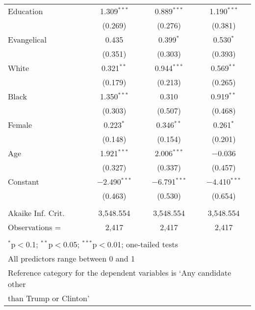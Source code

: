 \documentclass[12pt]{article}
\begin{document}
\begin{appendices}
\begin{refsection}
\begin{table}[!t]
\begin{adjustbox}{width=0.6\textwidth,center}
\begin{tabular}{@{\extracolsep{5pt}}lccc}
 Education & 1.309$^{***}$ & 0.889$^{***}$ & 1.190$^{***}$ \\ 
  & (0.269) & (0.276) & (0.381) \\ 
 Evangelical & 0.435 & 0.399$^{*}$ & 0.530$^{*}$ \\ 
  & (0.351) & (0.303) & (0.393) \\ 
 White & 0.321$^{**}$ & 0.944$^{***}$ & 0.569$^{**}$ \\ 
  & (0.179) & (0.213) & (0.265) \\ 
 Black & 1.350$^{***}$ & 0.310 & 0.919$^{**}$ \\ 
  & (0.303) & (0.507) & (0.468) \\ 
 Female & 0.223$^{*}$ & 0.346$^{**}$ & 0.261$^{*}$ \\ 
  & (0.148) & (0.154) & (0.201) \\ 
 Age & 1.921$^{***}$ & 2.006$^{***}$ & $-$0.036 \\ 
  & (0.327) & (0.337) & (0.457) \\ 
 Constant & $-$2.490$^{***}$ & $-$6.791$^{***}$ & $-$4.410$^{***}$ \\ 
  & (0.463) & (0.530) & (0.654) \\ 
\hline \\[-1.8ex] 
Akaike Inf. Crit. & 3,548.554 & 3,548.554 & 3,548.554 \\ 
Observations =  & 2,417 & 2,417 & 2,417 \\
\hline 
\hline \\[-1.8ex] 
\multicolumn{4}{l}{\footnotesize $^{*}$p$<$0.1; $^{**}$p$<$0.05; $^{***}$p$<$0.01; one-tailed tests} \\ 
\multicolumn{4}{l}{\footnotesize All predictors range between 0 and 1} \\
\multicolumn{4}{l}{\footnotesize Reference category for the dependent variables is `Any candidate other} \\
\multicolumn{4}{l}{\footnotesize \hspace{2pt} than Trump or Clinton'} \\
\end{tabular} 
\end{adjustbox}
\end{table}



\end{refsection}
\end{appendices}
\end{document}
